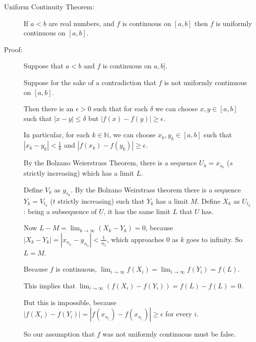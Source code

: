 \documentclass[12pt]{article}
\begin{document}
\begin{description}
\item[Uniform Continuity Theorem:]  If $a<b$ are real numbers, and $f$ is continuous on $[a,b]$ then $f$ is uniformly continuous on $[a,b]$.

\item[Proof:]  Suppose that $a<b$ and $f$ is continuous on $a,b]$.

Suppose for the sake of a contradiction that $f$ is not uniformly continuous on $[a,b]$.

Then there is an $\epsilon>0$ such that for each $\delta$ we can choose $x,y \in [a,b]$ such that
$|x-y|\leq \delta$ but $|f(x)-f(y)| \geq \epsilon$.

In particular, for each $k \in \mathbb N$, we can choose $x_k,y_k \in [a,b]$ such that
$|x_k - y_k| < \frac 1k$ and $|f(x_k)-f(y_k)| \geq \epsilon$.

By the Bolzano Weierstrass Theorem, there is a sequence $U_k = x_{s_k}$ ($s$ strictly increasing)
which has a limit $L$.

Define $V_k$ as $y_{s_k}$.  By the Bolzano Weirstrass theorem there is a sequence $Y_k = V_{t_k}$ ($t$ strictly increasing) such that $Y_k$ has a limit $M$.  Define $X_k$ as $U_{t_k}$:  being a subsequence
of $U$, it has the same limit $L$ that $U$ has.

Now $L - M = \lim_{k \rightarrow \infty} (X_k - Y_k) = 0$, because $|X_k-Y_k| = |x_{s_{t_k}} - y_{s_{t_k}}|< \frac1{s_{t_k}}$, which approaches 0 as $k$ goes to infinity.  So $L=M$.

Because $f$ is continuous, $\lim_{i \rightarrow \infty}f(X_i) = \lim_{i \rightarrow \infty}f(Y_i) = f(L)$.

This implies that $\lim_{i \rightarrow \infty}(f(X_i) - f(Y_i)) = f(L) - f(L) = 0$.

But this is impossible, because $|f(X_i) - f(Y_i)| = |f(x_{s_{t_i}}) - f(x_{s_{t_i}})| \geq \epsilon$ for
every $i$.

So our assumption that $f$ was not uniformly continuous must be false.




\end{description}
\end{document}
